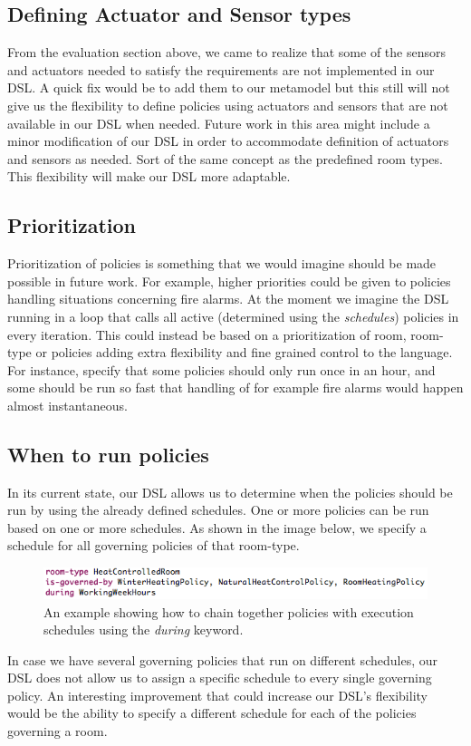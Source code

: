 \documentclass{llncs}
\begin{document}
\subsection{Defining Actuator and Sensor types}\label{subsec:def-sensor-actuator-types}
From the evaluation section above, we came to realize that some of the sensors and actuators needed to satisfy the requirements are not implemented in our DSL. A quick fix would be to add them to our metamodel but this still will not give us the flexibility to define policies using actuators and sensors that are not available in our DSL when needed. Future work in this area might include a minor modification of our DSL in order to accommodate definition of actuators and sensors as needed. Sort of the same concept as the predefined room types. This flexibility will make our DSL more adaptable.

\subsection{Prioritization}\label{subsec:looptime}
Prioritization of policies is something that we would imagine should be made possible in future work. For example, higher priorities could be given to policies handling situations concerning fire alarms. At the moment we imagine the DSL running in a loop that calls all active (determined using the \textit{schedules}) policies in every iteration. This could instead be based on a prioritization of room, room-type or policies adding extra flexibility and fine grained control to the language. For instance, specify that some policies should only run once in an hour, and some should be run so fast that handling of for example fire alarms would happen almost instantaneous. 

\subsection{When to run policies}\label{subsec:during}
In its current state, our DSL allows us to determine when the policies should be run by using the already defined schedules. One or more policies can be run based on one or more schedules. As shown in the image below, we specify a schedule for all governing policies of that room-type. 
\begin{figure}
  \centering
    \includegraphics[scale=0.5]{dsl-during.png} 
	\caption{An example showing how to chain together policies with execution schedules using the \textit{during} keyword.}
	\label{fig:during}
\end{figure}
In case we have several governing policies that run on different schedules, our DSL does not allow us to assign a specific schedule to every single governing policy. An interesting improvement that could increase our DSL's flexibility would be the ability to specify a different schedule for each of the policies governing a room.
\end{document}
